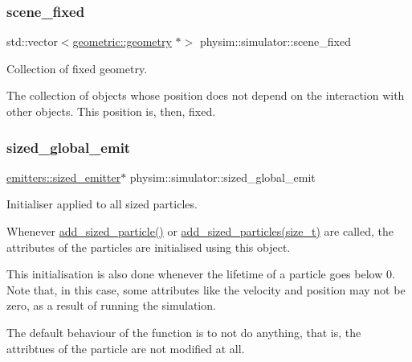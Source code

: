 \subsubsection{\texorpdfstring{scene\+\_\+fixed}{scene\_fixed}}
{\footnotesize\ttfamily std\+::vector$<$\hyperlink{classphysim_1_1geometric_1_1geometry}{geometric\+::geometry} $\ast$$>$ physim\+::simulator\+::scene\+\_\+fixed\hspace{0.3cm}{\ttfamily [private]}}



Collection of fixed geometry. 

The collection of objects whose position does not depend on the interaction with other objects. This position is, then, fixed. \mbox{\label{classphysim_1_1simulator_a61d4f20480309e95fce1db56b7fc8a88}} 
\subsubsection{\texorpdfstring{sized\+\_\+global\+\_\+emit}{sized\_global\_emit}}
{\footnotesize\ttfamily \hyperlink{classphysim_1_1emitters_1_1sized__emitter}{emitters\+::sized\+\_\+emitter}$\ast$ physim\+::simulator\+::sized\+\_\+global\+\_\+emit\hspace{0.3cm}{\ttfamily [private]}}



Initialiser applied to all sized particles. 

Whenever \hyperlink{classphysim_1_1simulator_ae36d99f98f5e470934eea0523ffca583}{add\+\_\+sized\+\_\+particle()} or \hyperlink{classphysim_1_1simulator_ae0551469d3c6b536da89bce04ff93fee}{add\+\_\+sized\+\_\+particles(size\+\_\+t)} are called, the attributes of the particles are initialised using this object.

This initialisation is also done whenever the lifetime of a particle goes below 0. Note that, in this case, some attributes like the velocity and position may not be zero, as a result of running the simulation.

The default behaviour of the function is to not do anything, that is, the attribtues of the particle are not modified at all. \mbox{\label{classphysim_1_1simulator_a307fe3207801e5497e690facc58fa8f5}} 
